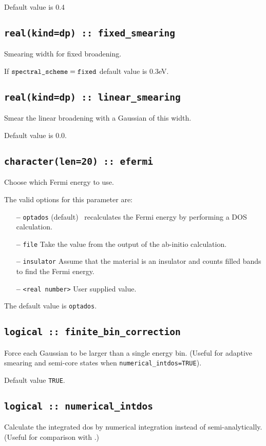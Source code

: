 \documentclass[a4paper,11pt,twoside]{book}
\begin{document}
Default value is 0.4

\subsection[fixed\_smearing]{\tt real(kind=dp) :: fixed\_smearing}
Smearing width for fixed broadening.

If $\verb#spectral_scheme# = \verb#fixed#$ default value is 0.3eV.


\subsection[adaptive\_smearing]{\tt real(kind=dp) :: linear\_smearing}
Smear the linear broadening with a Gaussian of this width. 

Default value is 0.0.

\subsection[compute\_efermi]{{\tt character(len=20) :: efermi}}
Choose which Fermi energy to use.

The valid options for this parameter are:
\begin{itemize}
\item[{\bf --}]  \verb#optados# (default) \optados\ recalculates the Fermi energy by performing a DOS calculation. 
\item[{\bf --}]  \verb#file# Take the value from the output of the ab-initio calculation.
\item[{\bf --}]  \verb#insulator# Assume that the material is an insulator and counts filled bands to find the Fermi energy.
\item[{\bf --}]  \verb#<real number># User supplied value.
\end{itemize}

The default value is {\tt optados}.

\subsection[finite\_bin\_correction]{\tt logical :: finite\_bin\_correction}
Force each Gaussian to be larger than a single energy bin. (Useful for adaptive smearing and semi-core states when \verb#numerical_intdos=TRUE#). 

Default value \verb#TRUE#.

\subsection[numerical\_intdos]{\tt logical :: numerical\_intdos}
Calculate the integrated dos by numerical integration instead of semi-analytically. (Useful for comparison with \lindos.)
\end{document}

